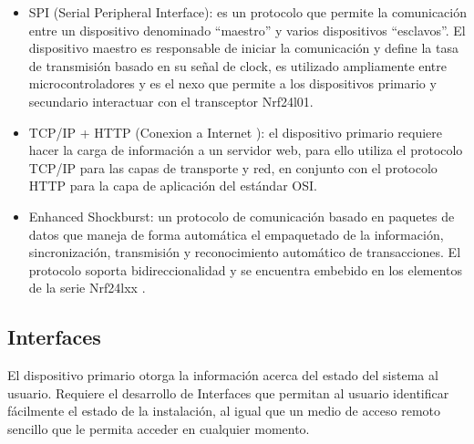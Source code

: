 \begin{itemize}
\item  SPI (Serial Peripheral Interface): es un protocolo \cite{SPI} que permite la comunicación entre un dispositivo denominado “maestro” y varios dispositivos “esclavos”. El dispositivo maestro es responsable de iniciar la comunicación y define la tasa de transmisión basado en su señal de clock, es utilizado ampliamente entre microcontroladores y es el nexo que permite a los dispositivos primario y secundario interactuar con el transceptor Nrf24l01.

\item  TCP/IP + HTTP (Conexion a Internet ): el dispositivo primario requiere hacer la carga de información a un servidor web, para ello utiliza el protocolo TCP/IP para las capas de transporte y red, en conjunto con el protocolo HTTP para la capa de aplicación del estándar OSI.

\item  Enhanced Shockburst: un protocolo de comunicación basado en paquetes de datos que maneja de forma automática el empaquetado de la información, sincronización, transmisión y reconocimiento automático de transacciones. El protocolo soporta bidireccionalidad y se encuentra embebido en los elementos de la serie Nrf24lxx \cite{nrf24_protocol}.
\end{itemize}

\subsection{Interfaces}

El dispositivo primario otorga la información acerca del estado del sistema  al usuario. Requiere el desarrollo de Interfaces que permitan al usuario identificar fácilmente el estado de la instalación, al igual que un medio de acceso remoto sencillo que le permita acceder en cualquier momento.  

